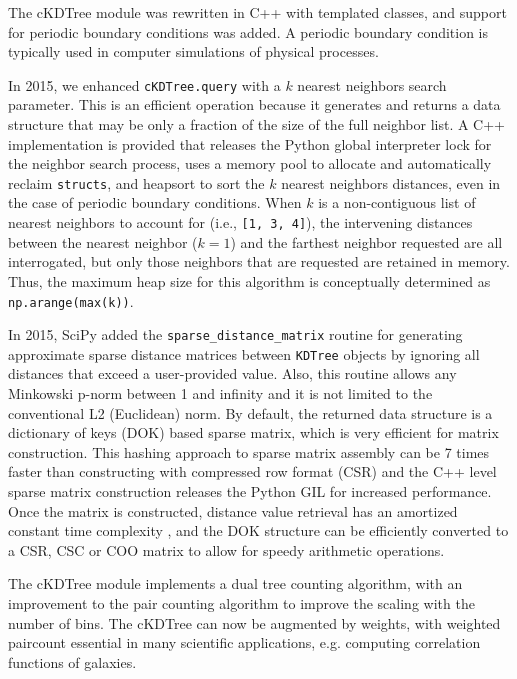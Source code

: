 The cKDTree module was rewritten in C++ with templated classes, and support for
periodic boundary conditions was added. A periodic boundary condition is typically 
used in computer simulations of physical processes.

In 2015, we enhanced \texttt{cKDTree.query} with a $k$ nearest neighbors search
parameter. This is an efficient operation\cite{Sproull:1991:RNS:3118219.3118331} 
because it generates and returns a data structure that may be only a fraction 
of the size of the full neighbor list. A C++ implementation is provided that releases
the Python global interpreter lock for the neighbor search process, uses
a memory pool to allocate and automatically reclaim \texttt{structs}, and
heapsort to sort the $k$ nearest neighbors distances, even in the case
of periodic boundary conditions. When $k$ is a non-contiguous list of nearest
neighbors to account for (i.e., \texttt{[1, 3, 4]}), the intervening distances
between the nearest neighbor ($k = 1$) and the farthest neighbor requested
are all interrogated, but only those neighbors that are requested are retained
in memory. Thus, the maximum heap size for this algorithm is conceptually determined
as \texttt{np.arange(max(k))}.

In 2015, SciPy added the \texttt{sparse\_distance\_matrix} routine for generating approximate 
sparse distance matrices between \texttt{KDTree} objects by ignoring all distances that 
exceed a user-provided value. Also, this routine allows any Minkowski p-norm between 1 and 
infinity and it is not limited to the conventional L2 (Euclidean) norm. 
By default, the returned data structure is a dictionary of keys (DOK) based sparse matrix, 
which is very efficient for matrix construction. 
This hashing approach to sparse matrix assembly can be 7 times faster than constructing 
with compressed row format (CSR) \cite{10.1007/978-3-540-75755-9_107} and the C++ level 
sparse matrix construction releases the Python GIL for increased performance. 
Once the matrix is constructed, distance value retrieval has an amortized constant time 
complexity \cite{Cormen:2001:IA:580470}, and the DOK structure can be efficiently converted 
to a CSR, CSC or COO matrix to allow for speedy arithmetic operations.

The cKDTree module implements a dual tree counting algorithm\cite{Moore2000ar},
with an improvement to the pair counting algorithm to improve the scaling
with the number of bins. The cKDTree can now be augmented by weights, with 
weighted paircount essential in many scientific applications, e.g. computing 
correlation functions of galaxies\cite{0004-637X-750-1-38}.

